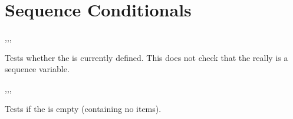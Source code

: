 \documentclass[oneside]{book}
\begin{document}

\section{Sequence Conditionals}

\begin{function}{\seqIfExist,\seqIfExistT,\seqIfExistF,\seqIfExistTF}
\begin{syntax}
 
  
  
   
\end{syntax}
Tests whether the  is currently defined.  This does not
check that the  really is a sequence variable.
\begin{demohigh}
\seqIfExistTF {} {}
\seqIfExistTF {} {}
\end{demohigh}
\end{function}

\begin{function}{\seqVarIfEmpty,\seqVarIfEmptyT,\seqVarIfEmptyF,\seqVarIfEmptyTF}
\begin{syntax}
 
  
  
   
\end{syntax}
Tests if the  is empty (containing no items).
\begin{demohigh}
\seqSetFromClist {}
\seqVarIfEmptyTF {} {}
\seqClear \lTmpaSeq
\seqVarIfEmptyTF {} {}
\end{demohigh}
\end{function}
\end{document}
